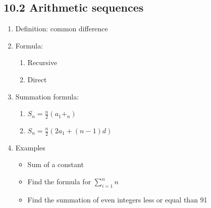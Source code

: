 \documentclass{article}
\begin{document}
\subsection{10.2 Arithmetic sequences}
\begin{enumerate}
\item Definition: common difference
\item Formula: 
\begin{enumerate}
\item Recursive
\item Direct
\end{enumerate}
\item Summation formula: 
\begin{enumerate}
\item $S_n = \frac{n}{2}(a_1+_n)$ 
\item $S_n = \frac{n}{2}(2a_1+(n-1)d)$
\end{enumerate}
\item Examples 
\begin{itemize}
\item Sum of a constant
\item Find the formula for $\sum_{i=1}^n n$
\item Find the summation of even integers less or equal than 91
\end{itemize}
\end{enumerate}
\end{document}
